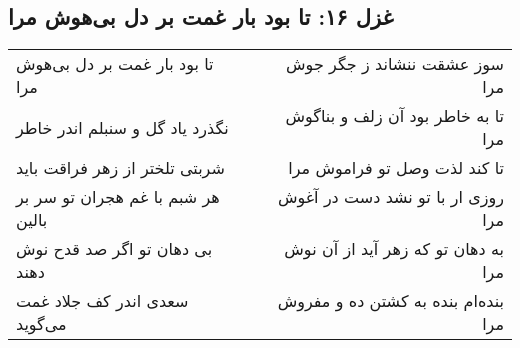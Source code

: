 \begin{center}
\section*{غزل ۱۶: تا بود بار غمت بر دل بی‌هوش مرا}
\label{sec:016}
\begin{longtable}{l p{0.5cm} r}
تا بود بار غمت بر دل بی‌هوش مرا
&&
سوز عشقت ننشاند ز جگر جوش مرا
\\
نگذرد یاد گل و سنبلم اندر خاطر
&&
تا به خاطر بود آن زلف و بناگوش مرا
\\
شربتی تلختر از زهر فراقت باید
&&
تا کند لذت وصل تو فراموش مرا
\\
هر شبم با غم هجران تو سر بر بالین
&&
روزی ار با تو نشد دست در آغوش مرا
\\
بی دهان تو اگر صد قدح نوش دهند
&&
به دهان تو که زهر آید از آن نوش مرا
\\
سعدی اندر کف جلاد غمت می‌گوید
&&
بنده‌ام بنده به کشتن ده و مفروش مرا
\\
\end{longtable}
\end{center}
